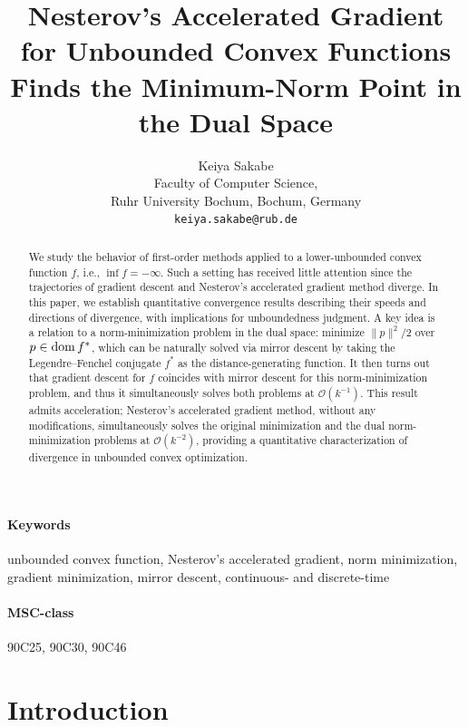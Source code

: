 \documentclass[11pt,a4paper]{article}
\title{{\Large Nesterov's Accelerated Gradient for Unbounded Convex Functions\\Finds the Minimum-Norm Point in the Dual Space}}
\author{{\Large Keiya Sakabe}\smallskip\\Faculty of Computer Science,\\Ruhr University Bochum, Bochum, Germany\\\texttt{keiya.sakabe@rub.de}}
\date{}
\theoremstyle{definition}
\theoremstyle{plain}
\newcommand{\dom}{\mathop{\rm dom}}
\begin{document}
\maketitle

\begin{abstract}
    We study the behavior of first-order methods applied to a lower-unbounded convex function $f$, i.e., $\inf f = -\infty$.
    Such a setting has received little attention since the trajectories of gradient descent and Nesterov's accelerated gradient method diverge.
    In this paper, we establish quantitative convergence results describing their speeds and directions of divergence, with implications for unboundedness judgment.
    A key idea is a relation to a norm-minimization problem in the dual space: minimize $\|p\|^2/2$ over $p \in \dom f^\ast$, which can be naturally solved via mirror descent by taking the Legendre--Fenchel conjugate $f^\ast$ as the distance-generating function.
    It then turns out that gradient descent for $f$ coincides with mirror descent for this norm-minimization problem, and thus it simultaneously solves both problems at $\mathcal{O}(k^{-1})$.
    This result admits acceleration; Nesterov's accelerated gradient method, without any modifications, simultaneously solves the original minimization and the dual norm-minimization problems at $\mathcal{O}(k^{-2})$, providing a quantitative characterization of divergence in unbounded convex optimization.
\end{abstract}

\paragraph{Keywords} unbounded convex function, Nesterov's accelerated gradient, norm minimization, gradient minimization, mirror descent, continuous- and discrete-time

\paragraph{MSC-class} 90C25, 90C30, 90C46

\section{Introduction}
\end{document}
